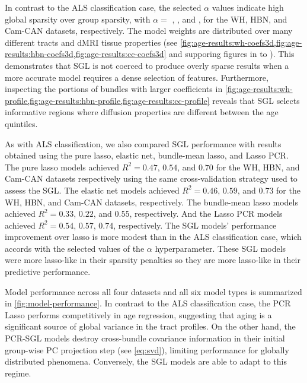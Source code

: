 \documentclass[10pt,letterpaper]{article}
\begin{document}
In contrast to the ALS classification case, the selected $\alpha$ values
indicate high global sparsity over group sparsity, with $\alpha = $
{\whLRatio}, {\hbnLRatio}, and {\ccLRatio}, for the WH, HBN, and Cam-CAN
datasets, respectively. The model weights are distributed over many different
tracts and dMRI tissue properties (see
\cref{fig:age-results:wh-coefs3d,fig:age-results:hbn-coefs3d,fig:age-results:cc-coefs3d}
and supporing figures in  to ).
This demonstrates that SGL is not coerced to produce overly sparse results
when a more accurate model requires a dense selection of features.
Furthermore, inspecting the portions of bundles with larger coefficients in
\cref{fig:age-results:wh-profile,fig:age-results:hbn-profile,fig:age-results:cc-profile}
reveals that SGL selects informative regions where diffusion properties are
different between the age quintiles.

As with ALS classification, we also compared SGL performance with results
obtained using
the pure lasso, elastic net, bundle-mean lasso, and Lasso PCR.
The pure lasso models achieved $R^2 = 0.47$, $0.54$, and $0.70$ for the WH, HBN, and Cam-CAN datasets respectively using the same cross-validation strategy used to assess the SGL.
The elastic net models achieved $R^2 = 0.46$, $0.59$, and $0.73$ for the WH, HBN, and Cam-CAN datasets, respectively. The bundle-mean lasso models achieved $R^2 = 0.33$, $0.22$, and $0.55$, respectively. And the Lasso PCR models achieved $R^2 = 0.54$, $0.57$, $0.74$, respectively.
The SGL models'
performance improvement over lasso is more modest than in the ALS
classification case, which accords with the selected values of the $\alpha$
hyperparameter. These SGL models were more lasso-like in their sparsity
penalties so they are more lasso-like in their predictive performance.

Model performance across all four datasets and all six model types is summarized
in \cref{fig:model-performance}. In contrast to the ALS classification case, the PCR Lasso performs
competitively in age regression, suggesting that aging is a significant source of global variance
in the tract profiles. On the other hand, the PCR-SGL models destroy cross-bundle covariance information
in their initial group-wise PC projection step (see \cref{eq:svd}), limiting performance
for globally distributed phenomena. Conversely, the SGL models are able to adapt to this regime.
\end{document}
